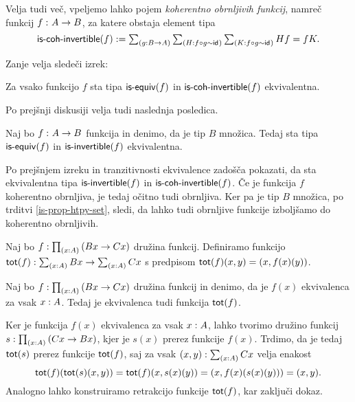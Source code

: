 Velja tudi več, vpeljemo lahko pojem \emph{koherentno obrnljivih funkcij}, namreč funkcij \(f \,\colon A \to B\), za katere obstaja element tipa
\[\textnormal{\textsf{is-coh-invertible}}(f) := \textstyle \sum_{\left( g : B \to A \right)} \textstyle \sum_{\left( H : f \circ g \sim \textnormal{\textsf{id}}_{} \right)} \textstyle \sum_{\left( K : f \circ g \sim \textnormal{\textsf{id}}_{} \right)} Hf = fK.\]

Zanje velja sledeči izrek:

\begin{izrek}
  Za vsako funkcijo \(f\) sta tipa \(\textnormal{\textsf{is-equiv}}(f)\) in \(\textnormal{\textsf{is-coh-invertible}}(f)\) ekvivalentna.
\end{izrek}

Po prejšnji diskusiji velja tudi naslednja posledica.

\begin{posledica}
  Naj bo \(f \,\colon A \to B\) funkcija in denimo, da je tip \(B\) množica. Tedaj sta tipa \(\textnormal{\textsf{is-equiv}}(f)\) in \(\textnormal{\textsf{is-invertible}}(f)\) ekvivalentna.
\end{posledica}

\begin{dokaz}
  Po prejšnjem izreku in tranzitivnosti ekvivalence zadošča pokazati, da sta ekvivalentna tipa \(\textnormal{\textsf{is-invertible}}(f)\) in \(\textnormal{\textsf{is-coh-invertible}}(f)\).
  Če je funkcija \(f\) koherentno obrnljiva, je tedaj očitno tudi obrnljiva. Ker pa je tip \(B\) množica, po trditvi \ref{is-prop-htpy-set}, sledi, da lahko tudi obrnljive funkcije izboljšamo do koherentno obrnljivih.
\end{dokaz}


\begin{definicija}
  Naj bo \(f : \textstyle \prod_{\left( x : A \right)} \left(Bx \to Cx\right)\) družina funkcij.
  Definiramo funkcijo
  \(\textnormal{\textsf{tot}}(f) : \textstyle \sum_{\left( x : A \right)} Bx \to \textstyle \sum_{\left( x : A \right)} Cx\) s predpisom
  \(\textnormal{\textsf{tot}}(f)(x, y) = (x, f(x)(y))\).
\end{definicija}

\begin{trditev}
  Naj bo \(f : \textstyle \prod_{\left( x : A \right)} \left(Bx \to Cx\right)\) družina funkcij
  in denimo, da je \(f(x)\) ekvivalenca za vsak \(x : A\). Tedaj je
  ekvivalenca tudi funkcija \(\textnormal{\textsf{tot}}(f)\).
\end{trditev}

\begin{dokaz}
  Ker je funkcija \(f(x)\) ekvivalenca za vsak \(x : A\),
  lahko tvorimo družino funkcij
  \(s : \textstyle \prod_{\left( x : A \right)} \left(Cx \to Bx\right)\), kjer je \(s(x)\)
  prerez funkcije \(f(x)\).
  Trdimo, da je tedaj \(\textnormal{\textsf{tot}}(s)\) prerez funkcije \(\textnormal{\textsf{tot}}(f)\), saj
  za vsak \((x, y) : \textstyle \sum_{\left( x : A \right)} Cx\) velja enakost
  \[\textnormal{\textsf{tot}}(f)(\textnormal{\textsf{tot}}(s)(x, y)) = \textnormal{\textsf{tot}}(f)(x, s(x)(y)) = (x, f(x)(s(x)(y))) = (x, y).\]
  Analogno lahko konstruiramo retrakcijo funkcije \(\textnormal{\textsf{tot}}(f)\), kar zaključi dokaz.
\end{dokaz}

